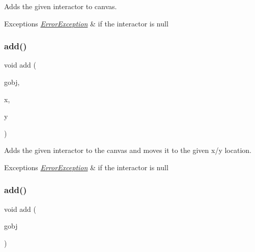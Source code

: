 Adds the given interactor to canvas. 


\begin{DoxyExceptions}{Exceptions}
{\em \mbox{\hyperlink{classErrorException}{Error\+Exception}}} & if the interactor is null \\
\hline
\end{DoxyExceptions}
\mbox{\label{classGCanvas_a8bb36f245efc7806414a1339c2befa1c}} 
\subsubsection{\texorpdfstring{add()}{add()}\hspace{0.1cm}{\footnotesize\ttfamily [2/4]}}
{\footnotesize\ttfamily void add (\begin{DoxyParamCaption}\item[{\mbox{\hyperlink{classGObject}{G\+Object}} $\ast$}]{gobj,  }\item[{double}]{x,  }\item[{double}]{y }\end{DoxyParamCaption})\hspace{0.3cm}{\ttfamily [virtual]}}



Adds the given interactor to the canvas and moves it to the given x/y location. 


\begin{DoxyExceptions}{Exceptions}
{\em \mbox{\hyperlink{classErrorException}{Error\+Exception}}} & if the interactor is null \\
\hline
\end{DoxyExceptions}
\mbox{\label{classGCanvas_ac732fc2123d7a6d7e2de145fe9bbd8e8}} 
\subsubsection{\texorpdfstring{add()}{add()}\hspace{0.1cm}{\footnotesize\ttfamily [3/4]}}
{\footnotesize\ttfamily void add (\begin{DoxyParamCaption}\item[{\mbox{\hyperlink{classGObject}{G\+Object}} \&}]{gobj }\end{DoxyParamCaption})\hspace{0.3cm}{\ttfamily [virtual]}}



